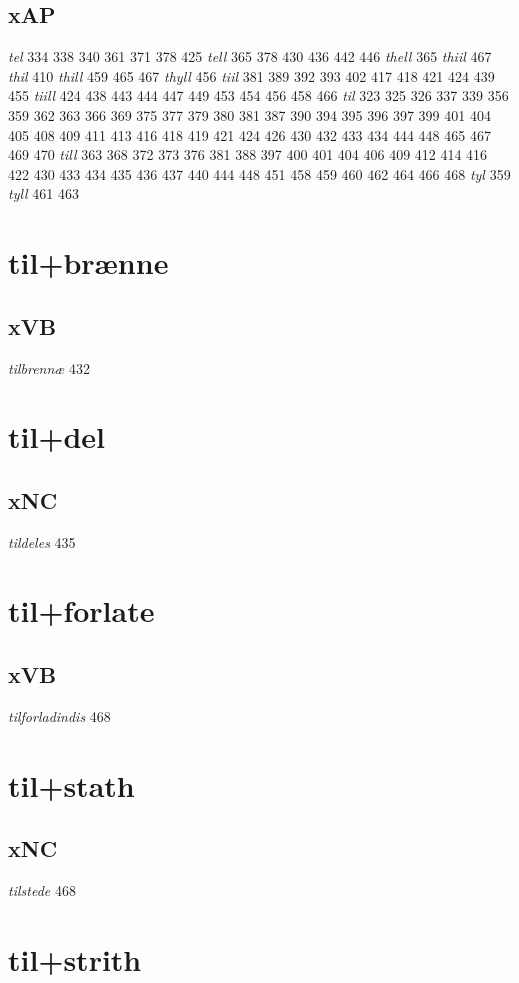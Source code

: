 \documentclass[a4paper,twocolumn]{article}
\begin{document}
\subsection{xAP}
\label{sec:org8d5616f}
\emph{tel} 334 338 340 361 371 378 425 \emph{tell} 365 378 430 436 442 446 \emph{thell} 365 \emph{thiil} 467 \emph{thil} 410 \emph{thill} 459 465 467 \emph{thyll} 456 \emph{tiil} 381 389 392 393 402 417 418 421 424 439 455 \emph{tiill} 424 438 443 444 447 449 453 454 456 458 466 \emph{til} 323 325 326 337 339 356 359 362 363 366 369 375 377 379 380 381 387 390 394 395 396 397 399 401 404 405 408 409 411 413 416 418 419 421 424 426 430 432 433 434 444 448 465 467 469 470 \emph{till} 363 368 372 373 376 381 388 397 400 401 404 406 409 412 414 416 422 430 433 434 435 436 437 440 444 448 451 458 459 460 462 464 466 468 \emph{tyl} 359 \emph{tyll} 461 463 
\section{til+brænne}
\label{sec:org8c4f143}
\subsection{xVB}
\label{sec:org18dd7e3}
\emph{tilbrennæ} 432 
\section{til+del}
\label{sec:orgaf369a0}
\subsection{xNC}
\label{sec:orgfcd7dfb}
\emph{tildeles} 435 
\section{til+forlate}
\label{sec:orgf6db61f}
\subsection{xVB}
\label{sec:orgdde9462}
\emph{tilforladindis} 468 
\section{til+stath}
\label{sec:org93cb8be}
\subsection{xNC}
\label{sec:org7c1c94c}
\emph{tilstede} 468 
\section{til+strith}
\label{sec:org89e4d4f}
\end{document}
